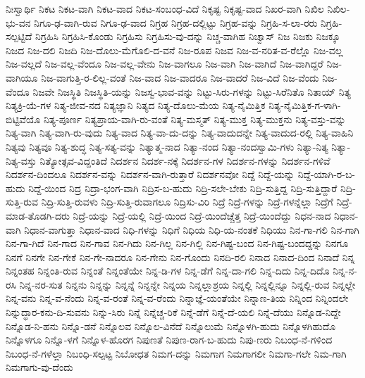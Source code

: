 ನಿಃಸ್ವಾರ್ಥಿ
ನಿಕಟ
ನಿಕಟ-ವಾಗಿ
ನಿಕಟ-ವಾದ
ನಿಕಟ-ಸಂಬಂಧ-ವಿದೆ
ನಿಕೃಷ್ಟ
ನಿಕೃಷ್ಟ-ವಾದ
ನಿಖರ-ವಾಗಿ
ನಿಖಿಲ
ನಿಖಿಲ-ಭು-ವನ
ನಿಗೂ-ಢ-ವಾಗಿ-ರುವ
ನಿಗೂ-ಢ-ವಾದ
ನಿಗ್ರಹ
ನಿಗ್ರಹ-ದಲ್ಲಿಟ್ಟು
ನಿಗ್ರಹ-ವನ್ನು
ನಿಗ್ರಹಿ-ಸ-ಲಾ-ರರು
ನಿಗ್ರಹಿ-ಸಲ್ಪಟ್ಟಿದೆ
ನಿಗ್ರಹಿಸಿ
ನಿಗ್ರಹಿಸಿ-ಕೊಂಡು
ನಿಗ್ರಹಿಸು
ನಿಗ್ರಹಿಸು-ವು-ದನ್ನು
ನಿಚ್ಚ-ವಾಗಿಹ
ನಿಚ್ವಾಸ್
ನಿಜ
ನಿಜಕು
ನಿಜಕ್ಕೂ
ನಿಜದ
ನಿಜ-ದಲಿ
ನಿಜದಿ
ನಿಜ-ದೊಲು-ಮೆಗೊಲಿ-ದ-ವನೆ
ನಿಜ-ರೂಪ
ನಿಜವ
ನಿಜ-ವ-ನರಿತ-ವ-ರೆಲ್ಲೊ
ನಿಜ-ವಲ್ಲ
ನಿಜ-ವಲ್ಲದೆ
ನಿಜ-ವಲ್ಲ-ವೆಂದೂ
ನಿಜ-ವಲ್ಲ-ವೇನು
ನಿಜ-ವಾಗಲೂ
ನಿಜ-ವಾಗಿ
ನಿಜ-ವಾಗಿದೆ
ನಿಜ-ವಾಗಿದ್ದರೆ
ನಿಜ-ವಾಗಿಯೂ
ನಿಜ-ವಾಗುತ್ತಿ-ರ-ಲಿಲ್ಲ-ವಂತೆ
ನಿಜ-ವಾದ
ನಿಜ-ವಾದರೂ
ನಿಜ-ವಾದರೆ
ನಿಜ-ವಿದೆ
ನಿಜ-ವೆಂದು
ನಿಜ-ವೆಂದೂ
ನಿಜವೇ
ನಿಜಸ್ಥಿತಿ
ನಿಜಸ್ಥಿತಿ-ಯನ್ನು
ನಿಜಸ್ವ-ಭಾವ-ವನ್ನು
ನಿಟ್ಟು-ಸಿರು-ಗಳನ್ನು
ನಿಟ್ಟು-ಸಿರೆನಿತೊ
ನಿತಾಯ್
ನಿತ್ಯ
ನಿತ್ಯಕ್ರಿ-ಯೆ-ಗಳ
ನಿತ್ಯ-ಜೀವ-ನದ
ನಿತ್ಯಜ್ಞಾನಿ
ನಿತ್ಯದ
ನಿತ್ಯ-ದೊಲು-ಮೆಯ
ನಿತ್ಯ-ನೈಮಿತ್ತಿಕ
ನಿತ್ಯ-ನೈಮಿತ್ತಿಕ-ಗ-ಳಾಗಿ-ಬಿಟ್ಟಿವೆಯೊ
ನಿತ್ಯ-ಪೂರ್ಣ
ನಿತ್ಯಪ್ರಾಯ-ವಾಗಿ-ರು-ವಂತೆ
ನಿತ್ಯ-ಮಸ್ಮತ್
ನಿತ್ಯ-ಮುಕ್ತ
ನಿತ್ಯ-ಮುಕ್ತನು
ನಿತ್ಯ-ವಸ್ತು-ವನ್ನು
ನಿತ್ಯ-ವಾಗಿ
ನಿತ್ಯ-ವಾಗಿ-ರು-ವುದು
ನಿತ್ಯ-ವಾದ
ನಿತ್ಯ-ವಾ-ದು-ದನ್ನು
ನಿತ್ಯ-ವಾದುದನ್ನೇ
ನಿತ್ಯ-ವಾದುದ-ರಲ್ಲಿ
ನಿತ್ಯ-ವಾಹಿನಿ
ನಿತ್ಯವು
ನಿತ್ಯವೂ
ನಿತ್ಯ-ಶುದ್ಧ
ನಿತ್ಯ-ಸತ್ಯ-ವನ್ನು
ನಿತ್ಯಾತ್ಮ-ನಾದ
ನಿತ್ಯಾ-ನಂದ
ನಿತ್ಯಾ-ನಂದಸ್ವಾಮಿ-ಗಳು
ನಿತ್ಯಾ-ನಿತ್ಯ
ನಿತ್ಯಾ-ನಿತ್ಯ-ವಸ್ತು
ನಿತ್ಯೋತ್ಸವ-ವಿದ್ದಂತಿದೆ
ನಿದರ್ಶನ
ನಿದರ್ಶ-ನಕ್ಕೆ
ನಿದರ್ಶನ-ಗಳ
ನಿದರ್ಶನ-ಗಳನ್ನು
ನಿದರ್ಶನ-ಗಳಿವೆ
ನಿದರ್ಶನ-ದಿಂದಲೂ
ನಿದರ್ಶನ-ವನ್ನು
ನಿದರ್ಶನ-ವಾಗಿ-ರುತ್ತಾರೆ
ನಿದರ್ಶನವೋ
ನಿದ್ದೆ
ನಿದ್ದೆ-ಯನ್ನು
ನಿದ್ದೆ-ಯಾಗಿ-ರ-ಬ-ಹುದು
ನಿದ್ದೆ-ಯಿಂದ
ನಿದ್ರ
ನಿದ್ರಾ-ಭಂಗ-ವಾಗಿ
ನಿದ್ರಿಸ-ಬ-ಹುದು
ನಿದ್ರಿ-ಸಲೇ-ಬೇಕು
ನಿದ್ರಿ-ಸುತ್ತಿದ್ದ
ನಿದ್ರಿ-ಸುತ್ತಿದ್ದಾರೆ
ನಿದ್ರಿ-ಸುತ್ತಿ-ರುವ
ನಿದ್ರಿ-ಸುತ್ತಿ-ರುವಳು
ನಿದ್ರಿ-ಸುತ್ತಿ-ರುವಾಗಲೂ
ನಿದ್ರಿಸು-ವಿರಿ
ನಿದ್ರೆ
ನಿದ್ರೆ-ಗಳನ್ನು
ನಿದ್ರೆ-ಗಳನ್ನೆಲ್ಲಾ
ನಿದ್ರೆಗೆ
ನಿದ್ರೆ-ಮಾಡ-ತೊಡಗಿ-ದರು
ನಿದ್ರೆ-ಯನ್ನು
ನಿದ್ರೆ-ಯಲ್ಲಿ
ನಿದ್ರೆ-ಯಿಂದ
ನಿದ್ರೆ-ಯಿಂದೆಚ್ಚೆತ್ತ
ನಿದ್ರೆ-ಯಿಂದೆದ್ದು
ನಿಧನ-ನಾದ
ನಿಧಾನ-ವಾಗಿ
ನಿಧಾನ-ವಾಗುತ್ತಾ
ನಿಧಾನ-ವಾದ
ನಿಧಿ-ಗಳನ್ನು
ನಿಧಿಗೆ
ನಿಧಿಯ
ನಿಧಿ-ಯ-ನಂತಕೆ
ನಿಧಿಯು
ನಿನ-ಗಾ-ಗಲಿ
ನಿನ-ಗಾಗಿ
ನಿನ-ಗಾ-ಗಿದೆ
ನಿನ-ಗಾದ
ನಿನ-ಗಾವ
ನಿನ-ಗಿದು
ನಿನ-ಗಿಲ್ಲ
ನಿನ-ಗಿಲ್ಲಿ
ನಿನ-ಗಿಷ್ಟ-ಬಂದ
ನಿನ-ಗಿಷ್ಟ-ಬಂದದ್ದನ್ನು
ನಿನಗೂ
ನಿನಗೆ
ನಿನಗೇ
ನಿನ-ಗೇಕೆ
ನಿನ-ಗೇ-ನಾದರೂ
ನಿನ-ಗೇನು
ನಿನ-ಗೊಂದು
ನಿನದಿ-ರಲಿ
ನಿನಾದ
ನಿನಾದ-ದಿಂದ
ನಿನಾದೆ
ನಿನ್ನ
ನಿನ್ನಂತಹ
ನಿನ್ನಂತಿ-ರುವ
ನಿನ್ನಂತೆ
ನಿನ್ನಂತೆಯೇ
ನಿನ್ನ-ಡಿ-ಗಳ
ನಿನ್ನ-ಡೆಗೆ
ನಿನ್ನ-ದಾ-ಗಲಿ
ನಿನ್ನ-ದಿದು
ನಿನ್ನ-ದಿದೊ
ನಿನ್ನ-ನ-ರಸಿ
ನಿನ್ನ-ನರ-ಸುತ
ನಿನ್ನನು
ನಿನ್ನನ್ನು
ನಿನ್ನನ್ನೆ
ನಿನ್ನನ್ನೇ
ನಿನ್ನಯ
ನಿನ್ನಲ್ಲಾಶ್ರಯ
ನಿನ್ನಲ್ಲಿ
ನಿನ್ನಲ್ಲಿನ್ನೂ
ನಿನ್ನಲ್ಲಿ-ರುವ
ನಿನ್ನಲ್ಲೇ
ನಿನ್ನ-ವನು
ನಿನ್ನ-ವ-ನೆಂದು
ನಿನ್ನ-ವ-ರಂತೆ
ನಿನ್ನ-ವ-ರೆಂದು
ನಿನ್ನಾಜ್ಞೆ-ಯಂತೆಯೇ
ನಿನ್ನಾಣ-ತಿಯ
ನಿನ್ನಿಂದ
ನಿನ್ನಿಂದಲೇ
ನಿನ್ನುದ್ಧಾರ-ಕನು-ದಿ-ಸುವನು
ನಿನ್ನು-ಸಿರು
ನಿನ್ನೆ
ನಿನ್ನೆಚ್ಚ-ರಿಕೆ
ನಿನ್ನೆ-ಡೆಗೆ
ನಿನ್ನೆ-ದೆ-ಯಲಿ
ನಿನ್ನೆ-ದೆಯು
ನಿನ್ನೊಡ-ನಿದ್ದೇ
ನಿನ್ನೊಡ-ನಿ-ಹನು
ನಿನ್ನೊ-ಡನೆ
ನಿನ್ನೊಲವ
ನಿನ್ನೊಲ-ವಿನೆದೆ
ನಿನ್ನೊಲುಮೆ
ನಿನ್ನೊಳಗಿ-ಹುದು
ನಿನ್ನೊಳಗಿಹುದೊ
ನಿನ್ನೊಳಗೂ
ನಿನ್ನೊ-ಳಗೆ
ನಿನ್ನೊಳ-ಹೊರಗ
ನಿಪುಣತೆ
ನಿಪುಣ-ರಾಗ-ಬ-ಹುದು
ನಿಪು-ಣರು
ನಿಬಂಧ-ನೆ-ಗಳಿಂದ
ನಿಬಂಧ-ನೆ-ಗಳೆಲ್ಲಾ
ನಿಬಂಧಿ-ಸಲ್ಪಟ್ಟ
ನಿಬೋಧತ
ನಿಮಗ-ದನ್ನು
ನಿಮಗಾಗ
ನಿಮಗಾಗಲೀ
ನಿಮಗಾ-ಗಲೇ
ನಿಮ-ಗಾಗಿ
ನಿಮಗಾಗು-ವು-ದೆಂದು
